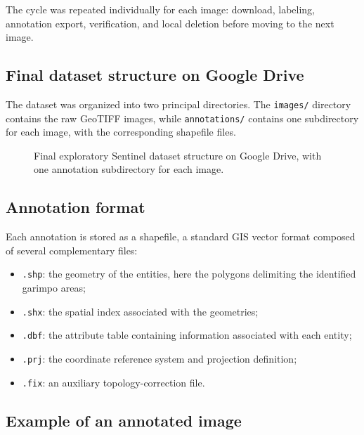 \documentclass[11pt,a4paper]{article}
\begin{document}
The cycle was repeated individually for each image: download, labeling, annotation export, verification, and local deletion before moving to the next image.

\subsection{Final dataset structure on Google Drive}

The dataset was organized into two principal directories. The \texttt{images/} directory contains the raw GeoTIFF images, while \texttt{annotations/} contains one subdirectory for each image, with the corresponding shapefile files.

\begin{figure}[H]
\caption{Final exploratory Sentinel dataset structure on Google Drive, with one annotation subdirectory for each image.}
\label{fig:structure_drive}
\end{figure}

\subsection{Annotation format}

Each annotation is stored as a shapefile, a standard GIS vector format composed of several complementary files:

\begin{itemize}
    \item \texttt{.shp}: the geometry of the entities, here the polygons delimiting the identified garimpo areas;
    \item \texttt{.shx}: the spatial index associated with the geometries;
    \item \texttt{.dbf}: the attribute table containing information associated with each entity;
    \item \texttt{.prj}: the coordinate reference system and projection definition;
    \item \texttt{.fix}: an auxiliary topology-correction file.
\end{itemize}

\subsection{Example of an annotated image}
\end{document}
